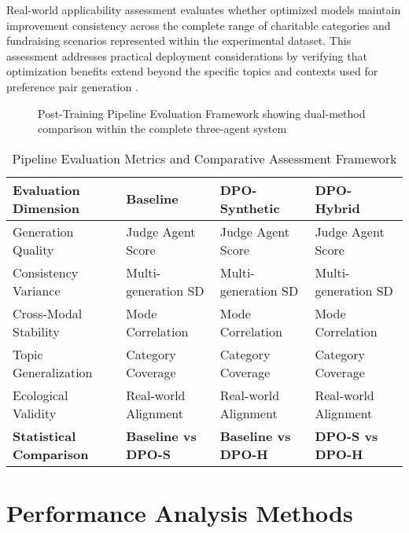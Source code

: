 Real-world applicability assessment evaluates whether optimized models maintain improvement consistency across the complete range of charitable categories and fundraising scenarios represented within the experimental dataset. This assessment addresses practical deployment considerations by verifying that optimization benefits extend beyond the specific topics and contexts used for preference pair generation \cite{lin2024meta_rewarding}.

\begin{figure}[htbp]
    \centering
    \caption{Post-Training Pipeline Evaluation Framework showing dual-method comparison within the complete three-agent system}
    \label{fig:post-training-pipeline}
\end{figure}

\begin{table}[htbp]
    \centering
    \caption{Pipeline Evaluation Metrics and Comparative Assessment Framework}
    \label{tab:pipeline-evaluation-metrics}
    \begin{tabular}{|l|l|l|l|}
    \hline
    \textbf{Evaluation Dimension} & \textbf{Baseline} & \textbf{DPO-Synthetic} & \textbf{DPO-Hybrid} \\
    \hline
    Generation Quality & Judge Agent Score & Judge Agent Score & Judge Agent Score \\
    Consistency Variance & Multi-generation SD & Multi-generation SD & Multi-generation SD \\
    Cross-Modal Stability & Mode Correlation & Mode Correlation & Mode Correlation \\
    Topic Generalization & Category Coverage & Category Coverage & Category Coverage \\
    Ecological Validity & Real-world Alignment & Real-world Alignment & Real-world Alignment \\
    \hline
    \textbf{Statistical Comparison} & \textbf{Baseline vs DPO-S} & \textbf{Baseline vs DPO-H} & \textbf{DPO-S vs DPO-H} \\
    \hline
    \end{tabular}
\end{table}

\section{Performance Analysis Methods}
\label{sec:performance-analysis}

